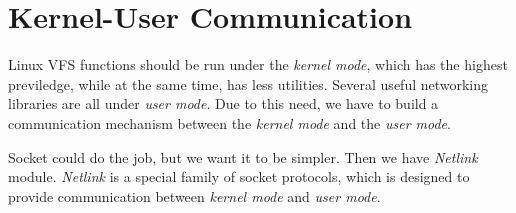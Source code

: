 
\section{Kernel-User Communication}

Linux VFS functions should be run under the \emph{kernel mode}, which has the highest previledge, while at the same time, has less utilities. Several useful networking libraries are all under \emph{user mode}. Due to this need, we have to build a communication mechanism between the \emph{kernel mode} and the \emph{user mode}. 

Socket could do the job, but we want it to be simpler. Then we have \emph{Netlink} module. \emph{Netlink} is a special family of socket protocols, which is designed to provide communication between \emph{kernel mode} and \emph{user mode}.

